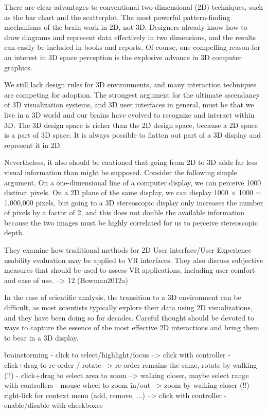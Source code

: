 There are clear advantages to conventional two-dimensional (2D) techniques, such as the bar chart and the scatterplot. The most powerful pattern-finding mechanisms of the brain work in 2D, not 3D. Designers already know how to draw diagrams and represent data effectively in two dimensions, and the results can easily be included in books and reports. Of course, one compelling reason for an interest in 3D space perception is the explosive advance in 3D computer graphics.
\cite{Ware2012}

We still lack design rules for 3D environments, and many interaction techniques are competing for adoption. The strongest argument for the ultimate ascendancy of 3D visualization systems, and 3D user interfaces in general, must be that we live in a 3D world and our brains have evolved to recognize and interact within 3D. The 3D design space is richer than the 2D design space, because a 2D space is a part of 3D space. It is always possible to flatten out part of a 3D display and represent it in 2D.
\cite{Ware2012}

Nevertheless, it also should be cautioned that going from 2D to 3D adds far less visual information than might be supposed. Consider the following simple argument. On a one-dimensional line of a computer display, we can perceive 1000 distinct pixels. On a 2D plane of the same display, we can display 1000 × 1000 = 1,000,000 pixels, but going to a 3D stereoscopic display only increases the number of pixels by a factor of 2, and this does not double the available information because the two images must be highly correlated for us to perceive stereoscopic depth.
\cite{Ware2012}

They examine how traditional methods for 2D User interface/User Experience usability evaluation may be applied to VR interfaces. They also discuss subjective measures that should be used to assess VR applications, including user comfort and ease of use. --> 12 (Bowman2012a)
\cite{Drouhard2015}

In the case of scientific analysis, the transition to a 3D environment can be difficult, as most scientists typically explore their data using 2D visualizations, and they have been doing so for decades. Careful thought should be devoted to ways to capture the essence of the most effective 2D interactions and bring them to bear in a 3D display.
\cite{Drouhard2015}


brainstorming
- click to select/highlight/focus   --> click with controller
- click+drag to re-order / rotate	--> re-order remains the same, rotate by walking (!!)
- click+drag to select area to zoom   --> walking closer, maybe select range with controllers
- mouse-wheel to zoom in/out   --> zoom by walking closer (!!)
- right-lick for context menu (add, remove, ...)   --> click with controller
- enable/disable with checkboxes

